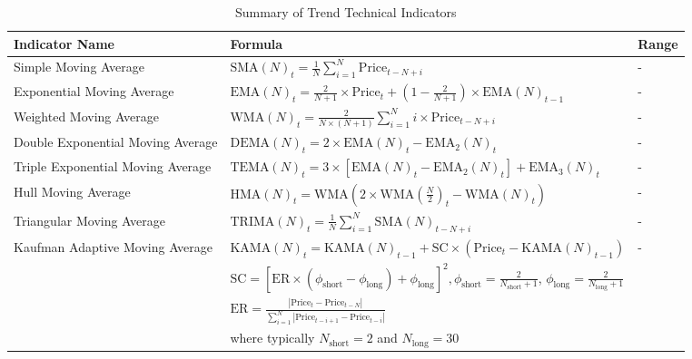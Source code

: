 \begin{table}[htb!]
\caption{Summary of Trend Technical Indicators}
\label{Table:TrendIndicators}
\centering
\footnotesize
\begin{tabularx}{\textwidth}{@{}lXl@{}}
\toprule
\textbf{Indicator Name} & \textbf{Formula} & \textbf{Range} \\ 
\midrule
Simple Moving Average & $\text{SMA}(N)_t = \frac{1}{N} \sum_{i=1}^{N} \text{Price}_{t-N+i}$ & - \\
\addlinespace
Exponential Moving Average & $\text{EMA}(N)_t = \frac{2}{N+1} \times \text{Price}_t + (1 - \frac{2}{N+1}) \times \text{EMA}(N)_{t-1}$ & - \\
\addlinespace
Weighted Moving Average & $\text{WMA}(N)_t = \frac{2}{N \times (N + 1)} \sum_{i=1}^{N} i \times \text{Price}_{t-N+i}$ & - \\
\addlinespace
Double Exponential Moving Average & $\text{DEMA}(N)_t = 2 \times \text{EMA}(N)_t - \text{EMA}_2(N)_t$ & - \\
\addlinespace
Triple Exponential Moving Average & $\text{TEMA}(N)_t = 3 \times [\text{EMA}(N)_t - \text{EMA}_2(N)_t] + \text{EMA}_3(N)_t$ & - \\
\addlinespace
Hull Moving Average & $\text{HMA}(N)_t = \text{WMA}\left(2 \times \text{WMA}\left(\frac{N}{2}\right)_t - \text{WMA}(N)_t\right)$ & - \\
\addlinespace
Triangular Moving Average & $\text{TRIMA}(N)_t = \frac{1}{N} \sum_{i=1}^{N} \text{SMA}(N)_{t-N+i}$ & - \\
\addlinespace
Kaufman Adaptive Moving Average & $\text{KAMA}(N)_t = \text{KAMA}(N)_{t-1} + \text{SC} \times (\text{Price}_t - \text{KAMA}(N)_{t-1})$ & - \\
\addlinespace
& $\text{SC} = [ \text{ER} \times (\phi_{\text{short}} - \phi_{\text{long}}) + \phi_{\text{long}} ]^2, \phi_{\text{short}} = \frac{2}{N_{\text{short}} + 1}$, $\phi_{\text{long}} = \frac{2}{N_{\text{long}} + 1}$ & \\
\addlinespace
& $\text{ER} = \frac{| \text{Price}_t - \text{Price}_{t-N} |}{\sum_{i=1}^{N} | \text{Price}_{t-i+1} - \text{Price}_{t-i} |}$ & \\
\addlinespace
& where typically $N_{\text{short}} = 2$ and $N_{\text{long}} = 30$ & \\
\bottomrule
\end{tabularx}
\end{table}
